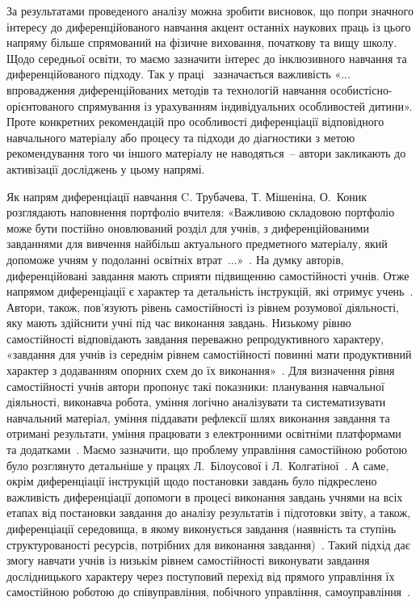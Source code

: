 За результатами проведеного аналізу можна зробити висновок, що попри значного інтересу до диференційованого навчання акцент останніх наукових праць із цього напряму більше спрямований на фізичне виховання, початкову та вищу школу. Щодо середньої освіти, то маємо зазначити інтерес до інклюзивного навчання та диференційованого підходу. Так у праці~\cite{Гайдаєнко_Рашидов_2021} зазначається важливість «... впровадження  диференційованих  методів  та  технологій  навчання особистісно-орієнтованого    спрямування    із    урахуванням індивідуальних особливостей дитини». Проте конкретних рекомендацій про особливості диференціації відповідного навчального матеріалу або процесу та підходи до діагностики з метою рекомендування того чи іншого матеріалу не наводяться~-- автори закликають до активізації досліджень у цьому напрямі. 

Як напрям диференціації навчання C. Трубачева, Т. Мішеніна, О.~Коник розглядають наповнення портфоліо вчителя: «Важливою складовою портфоліо може бути постійно оновлюваний розділ для учнів, з диференційованими завданнями для вивчення найбільш актуального предметного матеріалу, який допоможе учням у подоланні освітніх втрат~...»~\cite{Трубачева_Мішеніна_Коник_2024}. На думку авторів, диференційовані завдання мають сприяти підвищенню самостійності учнів. Отже напрямом диференціації є характер та детальність інструкцій, які отримує учень~\cite{Трубачева_Мішеніна_Коник_2024}. Автори, також, пов'язують рівень самостійності із рівнем розумової діяльності, яку мають здійснити учні під час виконання завдань. Низькому рівню самостійності відповідають завдання переважно репродуктивного характеру, «завдання для учнів із середнім рівнем самостійності повинні мати продуктивний характер з додаванням опорних схем до їх виконання»~\cite{Трубачева_Мішеніна_Коник_2024}. Для визначення рівня самостійності учнів автори пропонує такі показники: планування навчальної діяльності, виконавча робота, уміння логічно аналізувати та систематизувати навчальний матеріал, уміння піддавати рефлексії шлях виконання завдання та отримані результати, уміння працювати з електронними освітніми платформами та додатками~\cite{Трубачева_Мішеніна_Коник_2024}. Маємо зазначити, що проблему управління самостійною роботою було розглянуто детальніше у працях Л.~Білоусової і Л.~Колгатіної~\cite{Білоусова_2019}. А саме, окрім диференціації інструкцій щодо постановки завдань було підкреслено важливість диференціації допомоги в процесі виконання завдань учнями на всіх етапах від постановки завдання до аналізу результатів і підготовки звіту, а також, диференціації середовища, в якому виконується завдання (наявність та ступінь структурованості ресурсів, потрібних для виконання завдання)~\cite{Білоусова_2019}. Такий підхід дає змогу навчати учнів із низькім рівнем самостійності виконувати завдання дослідницького характеру через поступовий перехід від прямого управління їх самостійною роботою до співуправління, побічного управління, самоуправління~\cite{Bilousova_Kolgatina_Kolgatin_2023}.  


